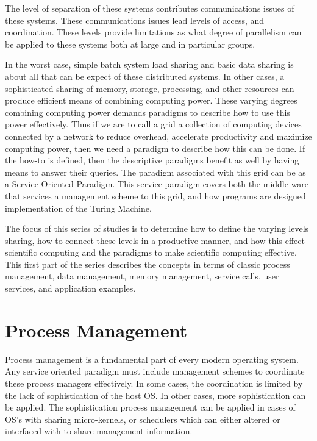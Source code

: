 \documentclass[11pt]{article}
\begin{document}
The level of separation of these systems contributes communications issues of these systems.  These communications issues lead levels of access, and coordination.  These levels provide limitations as what degree of parallelism can be applied to these systems both at large and in particular groups.  

In the worst case, simple batch system load sharing and basic data sharing is about all that can be expect of these distributed systems.  In other cases, a sophisticated sharing of memory, storage, processing, and other resources can produce efficient means of combining computing power.   These varying degrees combining computing power demands paradigms to describe how to use this power effectively.   Thus if we are to call a grid a collection of computing devices connected by a network to reduce overhead, accelerate productivity and maximize computing power, then we need a paradigm to describe how this can be done.  If the how-to is defined, then the descriptive paradigms benefit as well by having means to answer their queries.  The paradigm associated with this grid can be as a Service Oriented Paradigm.   This service paradigm covers both the middle-ware that services a management scheme to this grid, and how programs are designed implementation of the Turing Machine.  

The focus of this series of studies is to determine how to define the varying levels sharing, how to connect these levels in a productive manner, and how this effect scientific computing and the paradigms to make scientific computing effective.    This first part of the series describes the concepts in terms of classic process management, data management, memory management, service calls, user services, and application examples.  
 
 \section {Process Management}
 Process management is a fundamental part of every modern operating system.  Any service oriented paradigm must include management schemes to coordinate these process managers effectively.  In some cases, the coordination  is limited by the lack of sophistication of the host OS.  In other cases, more sophistication can be applied.  The sophistication process management can be applied in cases of OS's  with sharing micro-kernels,  or schedulers which can either altered or interfaced with to share management information.  
 
\end{document}
